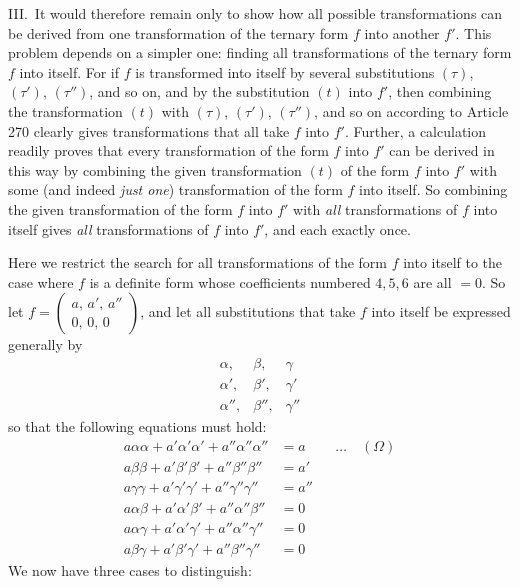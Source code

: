 III.\ It would therefore remain only to show how all possible
transformations can be derived from one transformation of the ternary
form $f$ into another $f'$. This problem depends on a simpler
one: finding all transformations of the ternary form $f$ into itself.
For if $f$ is transformed into itself by several substitutions
$(\tau)$, $(\tau')$, $(\tau'')$, and so on, and by the substitution $(t)$
into $f'$, then combining the transformation $(t)$ with $(\tau)$, $(\tau')$,
$(\tau'')$, and so on according to Article 270 clearly gives transformations
that all take $f$ into $f'$. Further, a calculation readily proves
that every transformation of the form $f$ into $f'$ can be derived
in this way by combining the given transformation $(t)$ of the form
$f$ into $f'$ with some (and indeed
\textit{just one}) transformation of the form $f$ into itself.
So combining the given transformation of the form $f$ into $f'$
with \textit{all} transformations of $f$ into itself gives \textit{all}
transformations of $f$ into $f'$, and each exactly once.

Here we restrict the search for all transformations of the form $f$
into itself to the case where $f$ is a definite form whose coefficients
numbered $4,5,6$ are all $=0$.
So let $f=\left(\begin{smallmatrix}a,\,a',\,a''\\0,\,0,\,0\end{smallmatrix}\right)$, and let all substitutions that take $f$ into itself
be expressed generally by
\[
\begin{array}{ccc}
\alpha,&\beta,&\gamma\\
\alpha',&\beta',&\gamma'\\
\alpha'',&\beta'',&\gamma''
\end{array}
\]
so that the following equations must hold:
\[
\begin{aligned}
a\alpha\alpha+a'\alpha'\alpha'+a''\alpha''\alpha''&=a&&\ldots\quad(\Omega)\\
a\beta\beta+a'\beta'\beta'+a''\beta''\beta''&=a'\\
a\gamma\gamma+a'\gamma'\gamma'+a''\gamma''\gamma''&=a''\\
a\alpha\beta+a'\alpha'\beta'+a''\alpha''\beta''&=0\\
a\alpha\gamma+a'\alpha'\gamma'+a''\alpha''\gamma''&=0\\
a\beta\gamma+a'\beta'\gamma'+a''\beta''\gamma''&=0
\end{aligned}
\]
We now have three cases to distinguish:

